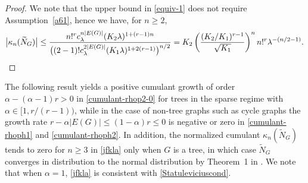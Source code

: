 \documentclass[bj,authoryear,noshowframe]{imsart}
\theoremstyle{plain}
\theoremstyle{remark}
\begin{document}
 \begin{proof}
   We note that the upper bound in \eqref{equiv-1}
   does not require Assumption~\ref{a61},
   hence we have, for $n\geq 2$,
 $$ 
    \big|\kappa_n(\widetilde{N}_G)\big|
   \leq 
    \frac{n!^r %
      c_\lambda^{n|E(G)|} (K_2 \lambda )^{1+(r-1)n}}{\big((2-1)! c_\lambda^{2|E(G)|}
    (K_1 \lambda )^{1+2(r-1)}\big)^{n/2}}
  = 
    K_2
    \left(
    \frac{ %
       (K_2/K_1)^{r-1}}{\sqrt{K_1}}
    \right)^n
    n!^r \lambda^{-(n/2-1)}. 
 $$ 
 \end{proof}
 The following result yields a positive cumulant growth
 of order $\alpha     -(\alpha - 1)r>0$
 in \eqref{cumulant-rhop2-0} for trees in the sparse regime
 with $\alpha \in [1, r/(r-1) )$,
 while in the case of non-tree graphs such as
 cycle graphs the growth rate
 $r - \alpha |E(G)|
 \leq ( 1 - \alpha ) r \leq 0$
 is negative or zero in \eqref{cumulant-rhoph1} and \eqref{cumulant-rhoph2}. 
 In addition, the normalized cumulant 
 $\kappa_n(\widetilde{N}_G)$ tends to zero for $n\geq 3$ in \eqref{jfkla} only
 when $G$ is a tree, in which case 
 $\widetilde{N}_G$ converges in distribution to the normal
 distribution by Theorem~1 in \cite{Janson1988}.   
 We note that when $\alpha = 1$, \eqref{jfkla} is consistent with
  \eqref{Statuleviciuscond}. 
 
  \vspace{-0.2cm}
 
\end{document}
